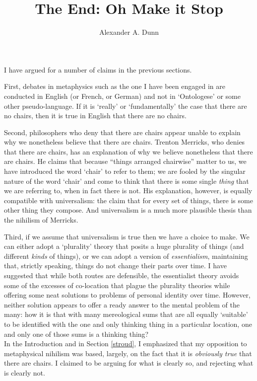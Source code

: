 \documentclass[11pt]{article}
\title{The End: Oh Make it Stop}
\author{Alexander A. Dunn}
\begin{document}
\ifstandalone
\maketitle
\begin{spacing}{1.5}
\fi

I have argued for a number of claims in the previous sections.

First, debates in metaphysics such as the one I have been engaged in
are conducted in English (or French, or German) and not in
`Ontologese' or some other pseudo-language.  If it is `really' or
`fundamentally' the case that there are no chairs, then it is true in
English that there are no chairs.

Second, philosophers who deny that there are chairs appear unable to
explain why we nonetheless believe that there are chairs.  Trenton
Merricks, who denies that there are chairs, has an explanation of why
we believe nonetheless that there are chairs.  He claims that because
``things arranged chairwise'' matter to us, we have introduced the
word `chair' to refer to them; we are fooled by the singular nature of
the word `chair' and come to think that there is some single {\em
  thing} that we are referring to, when in fact there is not.  His
explanation, however, is equally compatible with universalism: the
claim that for every set of things, there is some other thing they
compose.  And universalism is a much more plausible thesis than the
nihilism of Merricks.

Third, if we assume that universalism is true then we have a choice to
make.  We can either adopt a `plurality' theory that posits a huge
plurality of things (and different {\em kinds} of things), or we can
adopt a version of {\em essentialism}, maintaining that, strictly
speaking, things do not change their parts over time.  I have
suggested that while both routes are defensible, the essentialist
theory avoids some of the excesses of co-location that plague the
plurality theories while offering some neat solutions to problems of
personal identity over time.  However, neither solution appears to
offer a ready answer to the mental problem of the many: how it is that
with many mereological sums that are all equally `suitable' to be
identified with the one and only thinking thing in a particular
location, one and only one of those sums is a thinking thing? \\

In the Introduction and in Section \ref{stroud}, I emphasized that my
opposition to metaphysical nihilism was based, largely, on the fact
that it is {\em obviously true} that there are chairs.  I claimed to
be arguing for what is clearly so, and rejecting what is clearly not.


\end{spacing}
\end{document}
